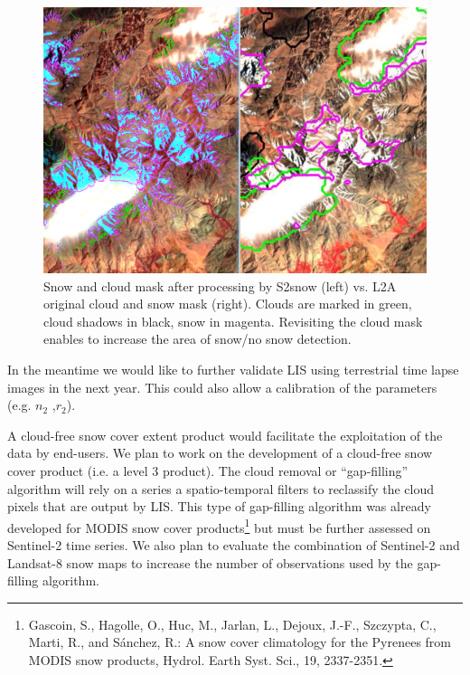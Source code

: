 \documentclass[a4paper]{article}
\begin{document}
\begin{figure}[h]
 \centering
 \includegraphics[width=\textwidth]{./images/Maroc_20130327_S4T5.png}
 \caption{Snow and cloud mask after processing by S2snow (left) vs. L2A original cloud and snow mask (right). Clouds are marked in green, cloud shadows in black, snow in magenta. Revisiting the cloud mask enables to increase the area of snow/no snow detection.}
 \label{fig:L2AvsLIS}
\end{figure}


In the meantime we would like to further validate LIS using terrestrial time lapse images in the next year. This could also allow a calibration of the parameters (e.g. $n_2$ ,$r_2$). 

A cloud-free snow cover extent product would facilitate the exploitation of the data by end-users. We plan to work on the development of a cloud-free snow cover product (i.e. a level 3 product). The cloud removal or ``gap-filling'' algorithm will rely on a series a spatio-temporal filters to reclassify the cloud pixels that are output by LIS. This type of gap-filling algorithm was already developed for MODIS snow cover products\footnote{Gascoin, S., Hagolle, O., Huc, M., Jarlan, L., Dejoux, J.-F., Szczypta, C., Marti, R., and Sánchez, R.: A snow cover climatology for the Pyrenees from MODIS snow products, Hydrol. Earth Syst. Sci., 19, 2337-2351.} but must be further assessed on Sentinel-2 time series. We also plan to evaluate the combination of Sentinel-2 and Landsat-8 snow maps to increase the number of observations used by the gap-filling algorithm. 

\clearpage

\appendix


\end{document}
